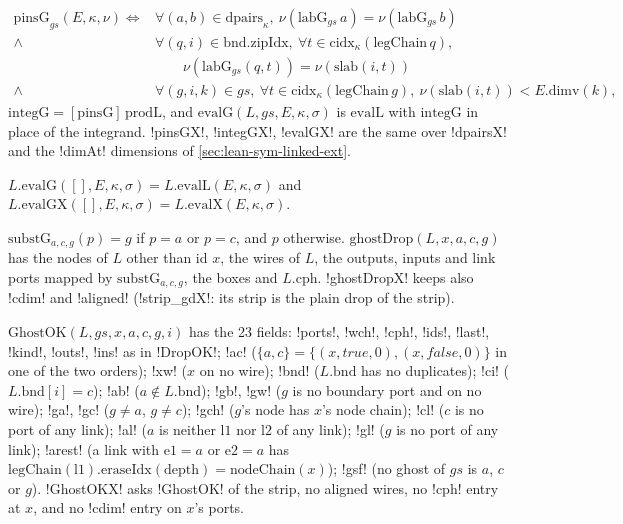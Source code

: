 \begin{definition}
\begin{align*}
\mathrm{pinsG}_{gs}(E,\kappa,\nu)\iff{}&\forall (a,b)\in\mathrm{dpairs}_\kappa,\ \nu(\mathrm{labG}_{gs}\,a)=\nu(\mathrm{labG}_{gs}\,b)\\
\land{}&\forall (q,i)\in\mathrm{bnd.zipIdx},\ \forall t\in\mathrm{cidx}_\kappa(\mathrm{legChain}\,q),\\
&\qquad\nu(\mathrm{labG}_{gs}(q,t))=\nu(\mathrm{slab}(i,t))\\
\land{}&\forall (g,i,k)\in gs,\ \forall t\in\mathrm{cidx}_\kappa(\mathrm{legChain}\,g),\ \nu(\mathrm{slab}(i,t))<E.\mathrm{dimv}(k),
\end{align*}
$\mathrm{integG}=[\mathrm{pinsG}]\,\mathrm{prodL}$, and $\mathrm{evalG}(L,gs,E,\kappa,\sigma)$ is $\mathrm{evalL}$ with $\mathrm{integG}$ in place of the integrand. \lean!pinsGX!, \lean!integGX!, \lean!evalGX! are the same over \lean!dpairsX! and the \lean!dimAt! dimensions of \cref{sec:lean-sym-linked-ext}.
\end{definition}

\begin{theorem}
$L.\mathrm{evalG}([],E,\kappa,\sigma)=L.\mathrm{evalL}(E,\kappa,\sigma)$ and $L.\mathrm{evalGX}([],E,\kappa,\sigma)=L.\mathrm{evalX}(E,\kappa,\sigma)$.
\end{theorem}

\begin{definition}
$\mathrm{substG}_{a,c,g}(p)=g$ if $p=a$ or $p=c$, and $p$ otherwise. $\mathrm{ghostDrop}(L,x,a,c,g)$ has the nodes of $L$ other than id $x$, the wires of $L$, the outputs, inputs and link ports mapped by $\mathrm{substG}_{a,c,g}$, the boxes and $L.\mathrm{cph}$. \lean!ghostDropX! keeps also \lean!cdim! and \lean!aligned! (\lean!strip_gdX!: its strip is the plain drop of the strip).
\end{definition}

\begin{definition}\label{def:lean-sym-ghostok}
$\mathrm{GhostOK}(L,gs,x,a,c,g,i)$ has the 23 fields: \lean!ports!, \lean!wch!, \lean!cph!, \lean!ids!, \lean!last!, \lean!kind!, \lean!outs!, \lean!ins! as in \lean!DropOK!; \lean!ac! ($\{a,c\}=\{(x,\mathit{true},0),(x,\mathit{false},0)\}$ in one of the two orders); \lean!xw! ($x$ on no wire); \lean!bnd! ($L.\mathrm{bnd}$ has no duplicates); \lean!ci! ($L.\mathrm{bnd}[i]=c$); \lean!ab! ($a\notin L.\mathrm{bnd}$); \lean!gb!, \lean!gw! ($g$ is no boundary port and on no wire); \lean!ga!, \lean!gc! ($g\ne a$, $g\ne c$); \lean!gch! ($g$'s node has $x$'s node chain); \lean!cl! ($c$ is no port of any link); \lean!al! ($a$ is neither $\mathrm{l1}$ nor $\mathrm{l2}$ of any link); \lean!gl! ($g$ is no port of any link); \lean!arest! (a link with $\mathrm{e1}=a$ or $\mathrm{e2}=a$ has $\mathrm{legChain}(\mathrm{l1}).\mathrm{eraseIdx}(\mathrm{depth})=\mathrm{nodeChain}(x)$); \lean!gsf! (no ghost of $gs$ is $a$, $c$ or $g$). \lean!GhostOKX! asks \lean!GhostOK! of the strip, no aligned wires, no \lean!cph! entry at $x$, and no \lean!cdim! entry on $x$'s ports.
\end{definition}

